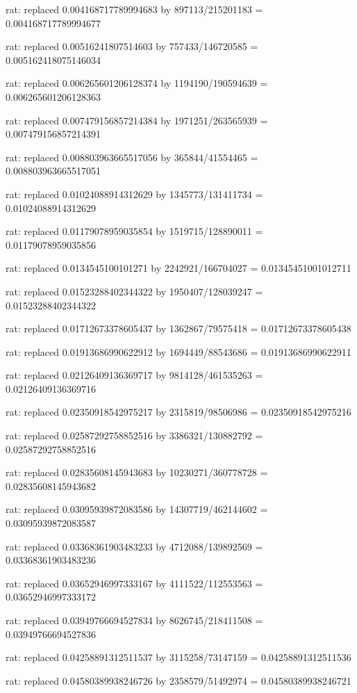 \documentclass[a4paper,10pt]{article}
\begin{document}
\begin{eulernotebook}
\begin{eulercomment}
\begin{eulercomment}
\begin{eulercomment}
\begin{eulercomment}
\begin{eulercomment}
\begin{eulercomment}
\begin{eulercomment}
\begin{eulercomment}
\begin{eulercomment}
\begin{eulercomment}
\begin{eulercomment}
\begin{eulercomment}
\begin{eulercomment}
\begin{eulercomment}
\begin{eulercomment}
\begin{eulercomment}
\begin{euleroutput}
  rat: replaced 0.004168717789994683 by 897113/215201183 = 0.004168717789994677
  
  rat: replaced 0.00516241807514603 by 757433/146720585 = 0.005162418075146034
  
  rat: replaced 0.006265601206128374 by 1194190/190594639 = 0.006265601206128363
  
  rat: replaced 0.007479156857214384 by 1971251/263565939 = 0.007479156857214391
  
  rat: replaced 0.008803963665517056 by 365844/41554465 = 0.008803963665517051
  
  rat: replaced 0.01024088914312629 by 1345773/131411734 = 0.01024088914312629
  
  rat: replaced 0.01179078959035854 by 1519715/128890011 = 0.01179078959035856
  
  rat: replaced 0.0134545100101271 by 2242921/166704027 = 0.01345451001012711
  
  rat: replaced 0.01523288402344322 by 1950407/128039247 = 0.01523288402344322
  
  rat: replaced 0.01712673378605437 by 1362867/79575418 = 0.01712673378605438
  
  rat: replaced 0.01913686990622912 by 1694449/88543686 = 0.01913686990622911
  
  rat: replaced 0.02126409136369717 by 9814128/461535263 = 0.02126409136369716
  
  rat: replaced 0.02350918542975217 by 2315819/98506986 = 0.02350918542975216
  
  rat: replaced 0.02587292758852516 by 3386321/130882792 = 0.02587292758852516
  
  rat: replaced 0.02835608145943683 by 10230271/360778728 = 0.02835608145943682
  
  rat: replaced 0.03095939872083586 by 14307719/462144602 = 0.03095939872083587
  
  rat: replaced 0.03368361903483233 by 4712088/139892569 = 0.03368361903483236
  
  rat: replaced 0.03652946997333167 by 4111522/112553563 = 0.03652946997333172
  
  rat: replaced 0.03949766694527834 by 8626745/218411508 = 0.03949766694527836
  
  rat: replaced 0.04258891312511537 by 3115258/73147159 = 0.04258891312511536
  
  rat: replaced 0.04580389938246726 by 2358579/51492974 = 0.04580389938246721
  

\end{euleroutput}
\end{eulercomment}
\end{eulercomment}
\end{eulercomment}
\end{eulercomment}
\end{eulercomment}
\end{eulercomment}
\end{eulercomment}
\end{eulercomment}
\end{eulercomment}
\end{eulercomment}
\end{eulercomment}
\end{eulercomment}
\end{eulercomment}
\end{eulercomment}
\end{eulercomment}
\end{eulercomment}
\end{eulernotebook}
\end{document}
